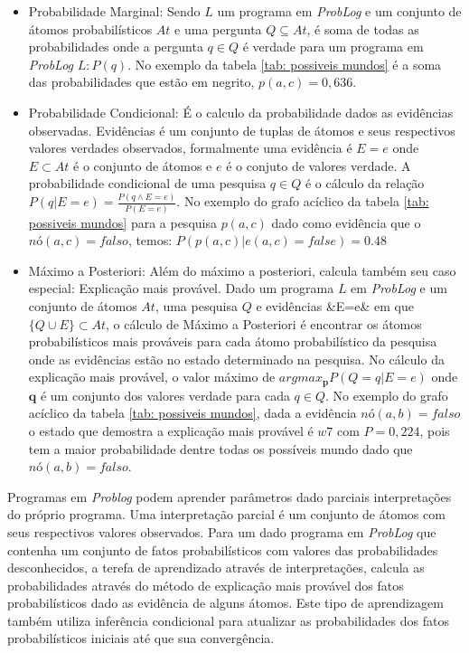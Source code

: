 \documentclass[
	12pt,				%
    oneside,			%
	a4paper,			%
	english,			%
	french,				%
	spanish,			%
	brazil,				%
	]{abntex2}
\begin{document}
\begin{itemize}
    \item Probabilidade Marginal: Sendo $L$ um programa em \textit{ProbLog} e um conjunto de átomos probabilísticos $At$ e uma pergunta $Q \subseteq At$, é soma de todas as probabilidades onde a pergunta $q \in Q$ é verdade para um programa em \textit{ProbLog} $L: P(q)$. No exemplo da tabela \ref{tab: possiveis mundos} é a soma das probabilidades que estão em negrito, $p(a, c)=0,636$.
    
    \item Probabilidade Condicional: É o calculo da probabilidade dados as evidências observadas. Evidências é um conjunto de tuplas de átomos e seus respectivos valores verdades observados, formalmente uma evidência é $E=e$ onde $E \subset At$ é o conjunto de átomos e $e$ é o conjuto de valores verdade. A probabilidade condicional de uma pesquisa $q \in Q$ é o cálculo da relação \(P(q|E=e)=\frac{P(q\wedge E=e)}{P(E=e)}\). No exemplo do grafo acíclico da tabela \ref{tab: possiveis mundos} para a pesquisa $p(a,c)$ dado como evidência que o $nó(a,c)=falso$, temos: $P(p(a, c)|e(a, c) = false) =0.48$ 
    
    \item Máximo a Posteriori: Além do máximo a posteriori, calcula também seu caso especial: Explicação mais provável. Dado um programa $L$ em \textit{ProbLog} e um conjunto de átomos $At$, uma pesquisa $Q$ e evidências &E=e& em que $\{Q \cup E\}\subset At$, o cálculo de Máximo a Posteriori é encontrar os átomos probabilísticos mais prováveis para cada átomo probabilístico da pesquisa onde as evidências estão no estado determinado na pesquisa. No cálculo da explicação mais provável, o valor máximo de $argmax_\textbf{p}P(Q=q|E=e)$ onde $\textbf{q}$ é um conjunto dos valores verdade para cada $q\in Q$. No exemplo do grafo acíclico da tabela \ref{tab: possiveis mundos}, dada a evidência $nó(a,b)= falso$ o estado que demostra a explicação mais provável é $w7$ com $P=0,224$, pois tem a maior probabilidade dentre todas os possíveis mundo dado que $nó(a,b)= falso$.
    
\end{itemize} 

Programas em \textit{Problog} podem aprender parâmetros dado parciais interpretações do próprio programa.  Uma interpretação parcial é um conjunto de átomos com seus respectivos valores observados. Para um dado programa em \textit{ProbLog} que contenha um conjunto de fatos probabilísticos com valores das probabilidades desconhecidos, a terefa de aprendizado através de interpretações, calcula as probabilidades através do método de explicação mais provável dos fatos probabilísticos dado as evidência de alguns átomos. Este tipo de aprendizagem também utiliza inferência condicional para atualizar as probabilidades dos fatos probabilísticos iniciais até que sua convergência.
\end{document}

